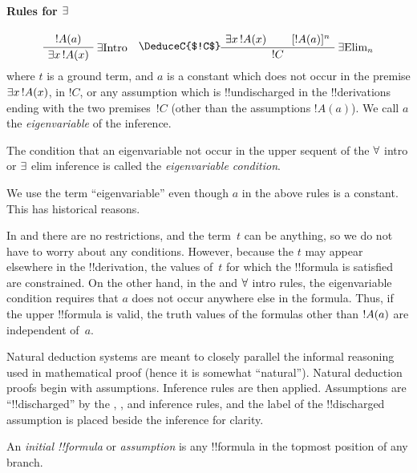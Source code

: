 \documentclass[../../../include/open-logic-section]{subfiles}
\begin{document}
\paragraph{Rules for $\lexists$}

\[
\AxiomC{$\Atom{!A}{a}$}
\RightLabel{\Intro{\lexists}}
\UnaryInfC{$\lexists[x][\Atom{!A}{x}]$}
\DisplayProof
\quad
\AxiomC{$\lexists[x][\Atom{!A}{x}]$}
\AxiomC{[$\Atom{!A}{a}$]$^n$}
\DeduceC{$!C$}
\RightLabel{$\lexists$Elim$_n$}
\BinaryInfC{$!C$}
\DisplayProof
\]
where $t$ is a ground term, and $a$ is a constant which does not occur
in the premise $\lexists[x][!A(x)]$, in $!C$, or any assumption which
is !!{undischarged} in the !!{derivation}s ending with the two
premises~$!C$ (other than the assumptions $!A(a)$).  We call $a$ the
\emph{eigenvariable} of the \Elim{\lexists} inference.

The condition that an eigenvariable not occur in the upper sequent of
the $\lforall$ intro or $\lexists$ elim inference is called the
\emph{eigenvariable condition}.

\begin{explain}
We use the term ``eigenvariable'' even though $a$ in the above rules
is a constant. This has historical reasons.

In \Intro{\lexists} and \Elim{\lforall} there are no restrictions, and
the term~$t$ can be anything, so we do not have to worry about any
conditions. However, because the $t$ may appear elsewhere in the
!!{derivation}, the values of~$t$ for which the !!{formula} is satisfied are
constrained. On the other hand, in the \Elim{\lexists} and $\lforall$
intro rules, the eigenvariable condition requires that $a$ does not
occur anywhere else in the formula. Thus, if the upper !!{formula} is
valid, the truth values of the formulas other than $\mathord{!A}(a)$ are
independent of~$a$.
\end{explain}

\begin{explain}
Natural deduction systems are meant to closely parallel the informal
reasoning used in mathematical proof (hence it is somewhat
``natural''). Natural deduction proofs begin with assumptions.
Inference rules are then applied. Assumptions are ``!!{discharged}''
by the \Intro{\lnot}, \Intro{\lif}, \Elim{\lor} and \Elim{\lexists}
inference rules, and the label of the !!{discharged} assumption is
placed beside the inference for clarity.
\end{explain}

\begin{defn}
An \emph{initial !!{formula}} or \emph{assumption} is any !!{formula}
in the topmost position of any branch.
\end{defn}
\end{document}
